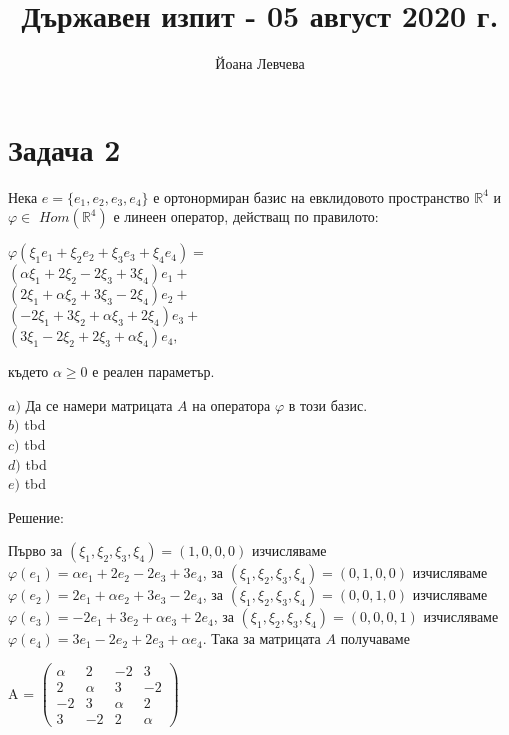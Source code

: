 \documentclass{article}
\title{Държавен изпит - 05 август 2020 г.}
\author{Йоана Левчева }
\begin{document}
\maketitle

\section*{Задача 2}

\justify

Нека $e = \{e_1, e_2, e_3, e_4\}$ е ортонормиран базис на евклидовото пространство $\mathbb{R}^4$ и $\varphi\in$ $Hom(\mathbb{R}^4)$ е линеен оператор, действащ по правилото:

\begin{center}
    $\varphi(\xi_1 e_1 + \xi_2 e_2 + \xi_3 e_3 + \xi_4 e_4) = $ \\
    $(\alpha\xi_1 + 2\xi_2-2\xi_3 + 3\xi_4)e_1 + $ \\
    $(2\xi_1 + \alpha\xi_2 + 3\xi_3 - 2\xi_4)e_2 + $ \\
    $(-2\xi_1 + 3\xi_2 + \alpha\xi_3 + 2\xi_4)e_3 + $ \\
    $(3\xi_1 - 2\xi_2 + 2\xi_3 + \alpha\xi_4)e_4, $
\end{center}

\justify
където $\alpha \geq 0$ е реален параметър.

\justify
$a)$ Да се намери матрицата $A$ на оператора $\varphi$ в този базис. \\
$b)$ tbd \\
$c)$ tbd \\
$d)$ tbd \\
$e)$ tbd

\justify
Решение:

\justify
Първо за $(\xi_1, \xi_2, \xi_3, \xi_4) = (1, 0, 0, 0)$ изчисляваме $\varphi(e_1) = \alpha e_1 + 2e_2 - 2e_3 + 3e_4$, за $(\xi_1, \xi_2, \xi_3, \xi_4) = (0, 1, 0, 0)$ изчисляваме $\varphi(e_2) = 2e_1 + \alpha e_2 + 3e_3 - 2e_4$, за $(\xi_1, \xi_2, \xi_3, \xi_4) = (0, 0, 1, 0)$ изчисляваме $\varphi(e_3) = -2e_1 + 3e_2 + \alpha e_3 + 2e_4$, за $(\xi_1, \xi_2, \xi_3, \xi_4) = (0, 0, 0, 1)$ изчисляваме $\varphi(e_4) = 3e_1 - 2e_2 + 2e_3 + \alpha e_4$. Така за матрицата $A$ получаваме

\begin{center}
    A = $\begin{pmatrix}
         \alpha & 2 & -2 & 3 \\
         2 & \alpha & 3 & -2 \\
         -2 & 3 & \alpha & 2 \\
         3 & -2 & 2 & \alpha
         \end{pmatrix}$
\end{center}
\end{document}
